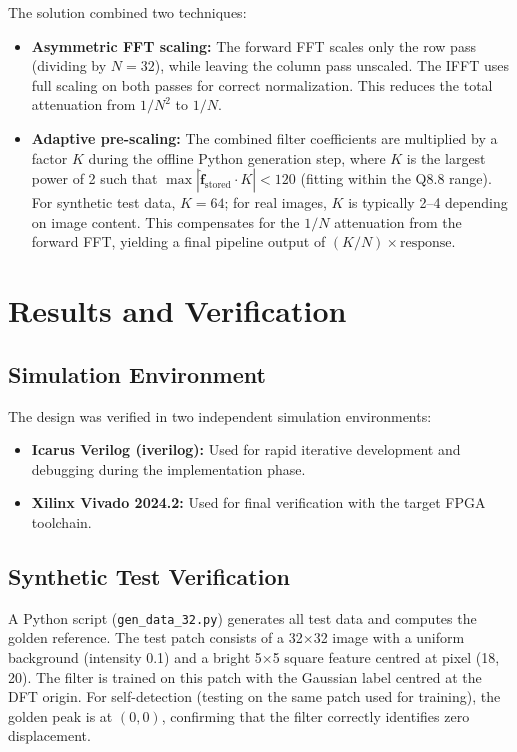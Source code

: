 \documentclass[a4paper,12pt]{report}
\begin{document}
The solution combined two techniques:
\begin{itemize}
    \item \textbf{Asymmetric FFT scaling:} The forward FFT scales only the row pass (dividing by $N=32$), while leaving the column pass unscaled. The IFFT uses full scaling on both passes for correct normalization. This reduces the total attenuation from $1/N^2$ to $1/N$.
    \item \textbf{Adaptive pre-scaling:} The combined filter coefficients are multiplied by a factor $K$ during the offline Python generation step, where $K$ is the largest power of 2 such that $\max|\hat{\mathbf{f}}_{\text{stored}} \cdot K| < 120$ (fitting within the Q8.8 range). For synthetic test data, $K = 64$; for real images, $K$ is typically 2--4 depending on image content. This compensates for the $1/N$ attenuation from the forward FFT, yielding a final pipeline output of $(K/N) \times \text{response}$.
\end{itemize}

\chapter{Results and Verification}
\section{Simulation Environment}
The design was verified in two independent simulation environments:
\begin{itemize}
    \item \textbf{Icarus Verilog (iverilog):} Used for rapid iterative development and debugging during the implementation phase.
    \item \textbf{Xilinx Vivado 2024.2:} Used for final verification with the target FPGA toolchain.
\end{itemize}

\section{Synthetic Test Verification}
A Python script (\texttt{gen\_data\_32.py}) generates all test data and computes the golden reference. The test patch consists of a 32$\times$32 image with a uniform background (intensity 0.1) and a bright 5$\times$5 square feature centred at pixel (18, 20). The filter is trained on this patch with the Gaussian label centred at the DFT origin. For self-detection (testing on the same patch used for training), the golden peak is at $(0, 0)$, confirming that the filter correctly identifies zero displacement.
\end{document}
